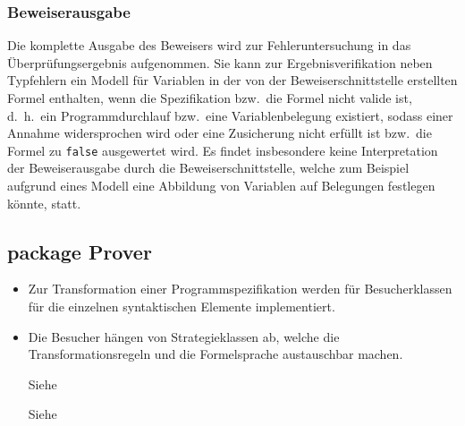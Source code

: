 \subsubsection{Beweiserausgabe}%

Die komplette Ausgabe des Beweisers wird zur Fehleruntersuchung in das
Überprüfungsergebnis aufgenommen. Sie kann zur Ergebnisverifikation
neben Typfehlern ein Modell für Variablen in der von der
Beweiserschnittstelle erstellten Formel enthalten, wenn die
Spezifikation bzw.\ die Formel nicht valide ist, d.~h.\ ein
Programmdurchlauf bzw.\ eine Variablenbelegung existiert, sodass einer
Annahme widersprochen wird oder eine Zusicherung nicht erfüllt ist
bzw.\ die Formel zu \texttt{false} ausgewertet wird. Es findet
insbesondere keine Interpretation der Beweiserausgabe durch die
Beweiserschnittstelle, welche zum Beispiel aufgrund eines Modell eine
Abbildung von Variablen auf Belegungen festlegen könnte, statt.%


\subsection{package Prover}%

\begin{itemize}%
    \item Zur Transformation einer Programmspezifikation werden für
     Besucherklassen für die einzelnen syntaktischen
    Elemente implementiert.%

    \item Die Besucher hängen von Strategieklassen ab, welche die
    Transformationsregeln und die Formelsprache austauschbar machen.%

    Siehe %

    Siehe %


\end{itemize}%

